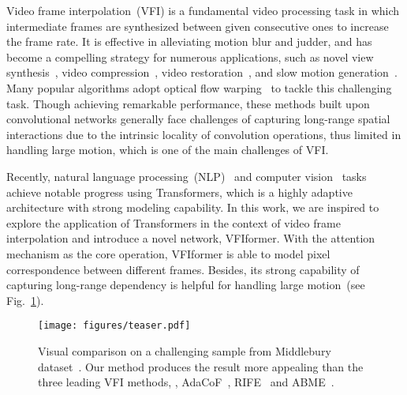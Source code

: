 \documentclass[10pt,twocolumn,letterpaper]{article}
\begin{document}
	
	Video frame interpolation~(VFI) is a fundamental video processing task in which intermediate frames are synthesized between given consecutive ones to increase the frame rate. It is effective in alleviating motion blur and judder, and has become a compelling strategy for numerous applications, such as novel view synthesis~\cite{flynn2016deepstereo,kalantari2016learning}, video compression~\cite{wu2018video}, video restoration~\cite{haris2020space,xiang2020zooming,kim2020fisr}, and slow motion generation~\cite{niklaus2017video,liu2017video,jiang2018super,niklaus2018context,peleg2019net,bao2019depth}.
	Many popular algorithms adopt optical flow warping~\cite{liu2017video,jiang2018super,bao2019depth,niklaus2018context,softsplat,bao2019memc,liu2019deep,xu2019quadratic,park2020bmbc,asymmetric,xvfi} to tackle this challenging task. Though achieving remarkable performance, these methods built upon convolutional networks generally face challenges of capturing long-range spatial interactions due to the intrinsic locality of convolution operations, thus limited in handling large motion, which is one of the main challenges of VFI. 


	Recently, natural language processing~(NLP)~\cite{vaswani2017attention,devlin2018bert,brown2020language} and computer vision~\cite{dosovitskiy2020image,carion2020end,liu2021swin} tasks achieve notable progress using Transformers, which is a highly adaptive architecture with strong modeling capability. In this work, we are inspired to explore the application of Transformers in the context of video frame interpolation and introduce a novel network, VFIformer. With the attention mechanism as the core operation, VFIformer is able to model pixel correspondence between different frames. Besides, its strong capability of capturing long-range dependency is helpful for handling large motion~(see Fig.~\ref{fig:teaser}). 
	
	
	\begin{figure}[t]
		\begin{center}
\texttt{[image: figures/teaser.pdf]}
		\end{center}
\caption{Visual comparison on a challenging sample from Middlebury dataset~\cite{middlebury}. Our method produces the result more appealing than the three leading VFI methods, \ie, AdaCoF~\cite{lee2020adacof}, RIFE~\cite{rife} and ABME~\cite{asymmetric}.}
		\label{fig:teaser}
	\end{figure}
	
\end{document}
